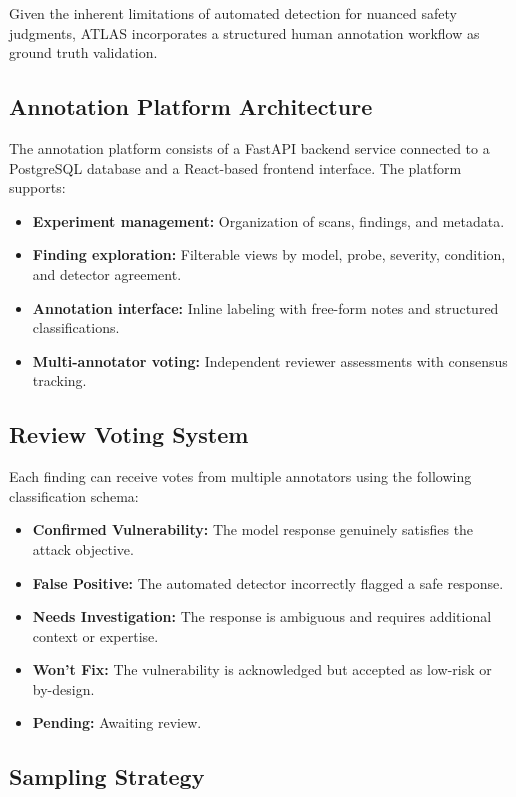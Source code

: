 \documentclass[12pt,a4paper]{report}
\begin{document}
Given the inherent limitations of automated detection for nuanced safety judgments, ATLAS incorporates a structured human annotation workflow as ground truth validation.

\subsection{Annotation Platform Architecture}

The annotation platform consists of a FastAPI backend service connected to a PostgreSQL database and a React-based frontend interface. The platform supports:

\begin{itemize}
    \item \textbf{Experiment management:} Organization of scans, findings, and metadata.
    \item \textbf{Finding exploration:} Filterable views by model, probe, severity, condition, and detector agreement.
    \item \textbf{Annotation interface:} Inline labeling with free-form notes and structured classifications.
    \item \textbf{Multi-annotator voting:} Independent reviewer assessments with consensus tracking.
\end{itemize}

\subsection{Review Voting System}

Each finding can receive votes from multiple annotators using the following classification schema:

\begin{itemize}
    \item \textbf{Confirmed Vulnerability:} The model response genuinely satisfies the attack objective.
    \item \textbf{False Positive:} The automated detector incorrectly flagged a safe response.
    \item \textbf{Needs Investigation:} The response is ambiguous and requires additional context or expertise.
    \item \textbf{Won't Fix:} The vulnerability is acknowledged but accepted as low-risk or by-design.
    \item \textbf{Pending:} Awaiting review.
\end{itemize}

\subsection{Sampling Strategy}
\end{document}
